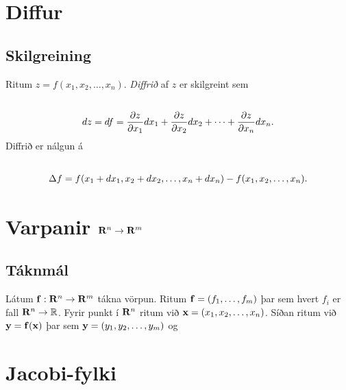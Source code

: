 \documentclass[a4paper,10pt,icelandic]{sphinxmanual}
\begin{document}
\section{Diffur}
\label{Kafli2:diffur}

\subsection{Skilgreining}
\label{Kafli2:index-18}\label{Kafli2:id35}
Ritum \(z=f(x_1, x_2, \ldots, x_n)\). \emph{Diffrið} af \(z\) er
skilgreint sem
\begin{gather}
\begin{split}\displaystyle\end{split}\notag\\\begin{split}dz=df=\frac{\partial z}{\partial x_1}dx_1
+\frac{\partial z}{\partial x_2}dx_2
+\cdots+\frac{\partial z}{\partial x_n}dx_n.\end{split}\notag
\end{gather}
Diffrið er nálgun á
\begin{gather}
\begin{split}\displaystyle\end{split}\notag\\\begin{split}\Delta f=f(x_1+dx_1, x_2+dx_2,\ldots,
x_n+dx_n)-f(x_1,x_2,\ldots,x_n).\end{split}\notag
\end{gather}

\section{Varpanir \(\mbox{${\bf R}^n$}\rightarrow\mbox{${\bf R}^m$}\)}
\label{Kafli2:varpanir}

\subsection{Táknmál}
\label{Kafli2:taknmal}
Látum
\(\mbox{${\bf f}$}:\mbox{${\bf R}^n$}\rightarrow\mbox{${\bf R}^m$}\)
tákna vörpun. Ritum \(\mbox{${\bf f}$}=(f_1,\ldots,f_m)\) þar sem
hvert \(f_i\) er fall
\(\mbox{${\bf R}^n$}\rightarrow{\mathbb  R}\). Fyrir punkt í
\(\mbox{${\bf R}^n$}\) ritum við
\(\mbox{${\bf x}$}=(x_1,x_2,\ldots,x_n)\). Síðan ritum við
\(\mbox{${\bf y}$}=\mbox{${\bf f}$}(\mbox{${\bf x}$})\) þar sem
\(\mbox{${\bf y}$}=(y_1,y_2,\ldots,y_m)\) og


\section{Jacobi-fylki}
\label{Kafli2:jacobi-fylki}
\end{document}
